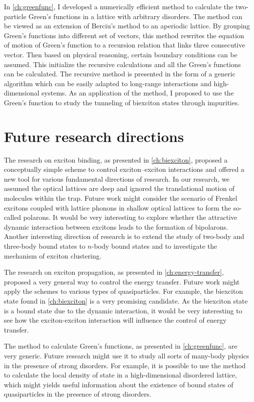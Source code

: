 In \autoref{ch:greenfunc}, I developed a numerically efficient method to calculate the two-particle Green's functions in a 
lattice with arbitrary disorders. The method can be viewed as an extension of Berciu's method \cite{Berciu2010, Berciu2011, 
Berciu2012} to an aperiodic lattice. By grouping Green's functions into different set of vectors, this method rewrites the 
equation of motion of Green's function to a recursion relation that links three consecutive vector. Then  based on physical 
reasoning, certain boundary conditions can be assumed. This initialize the recursive calculations and all the Green's 
functions can be calculated.  The recursive method is presented in the form of a generic algorithm which can be easily 
adapted to long-range interactions and high-dimensional systems. As an application of the method, I proposed 
to use the Green’s function to study the tunneling of biexciton states through
 impurities.



\section{Future research directions}
%

The research on exciton binding, as presented in \autoref{ch:biexciton}, proposed a conceptually simple scheme to control 
exciton--exciton interactions and offered a new tool for various fundamental directions of research. In our research, we 
assumed the optical lattices are deep and ignored the translational motion of molecules within the trap. Future work might 
consider the scenario of Frenkel excitons coupled with lattice phonons in shallow optical lattices to form the so-called polarons. It would be very interesting to explore whether the attractive dynamic interaction 
between excitons leads to the formation of bipolarons. Another interesting direction of research is to extend the study of 
two-body and three-body bound states to $n$-body bound states and to investigate the mechanism of exciton clustering. 

The research on exciton propagation, as presented in \autoref{ch:energy-transfer}, proposed a very general way to control
the energy transfer. Future work might apply the schemes to various types of quasiparticles. For 
example, the biexciton state found in \autoref{ch:biexciton} is a very promising candidate. As the biexciton state is a 
bound state due to the dynamic interaction, it would be very interesting to see how the exciton-exciton interaction will 
influence the control of energy transfer. 

The method to calculate Green's functions, as presented in \autoref{ch:greenfunc}, are very generic. Future research might
use it to study all sorts of many-body physics in the presence of strong disorders. For example, it is possible to
use the method to calculate the local density of state in a  high-dimensional disordered lattice, which might yields useful information about the 
existence of bound states of quasiparticles in the presence of strong disorders. 


 